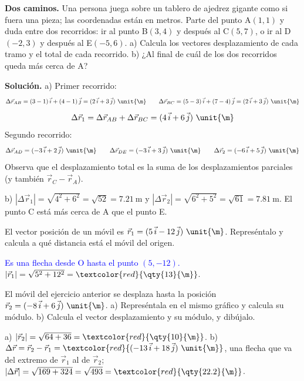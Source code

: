 \begin{example}
    \textbf{Dos caminos.} Una persona juega sobre un tablero de ajedrez gigante como si fuera una pieza; las coordenadas están en
    metros. Parte del punto A\((1, 1)\) y duda entre dos recorridos: ir al punto B\((3, 4)\) y después al C\((5, 7)\), o ir al
    D\((-2, 3)\) y después al E\((-5, 6)\). a) Calcula los vectores desplazamiento de cada tramo y el total de cada recorrido.
    b) ¿Al final de cuál de los dos recorridos queda más cerca de A?

    \textbf{Solución.} a) Primer recorrido:
    \[ \Delta\vec r_{AB} = (3 - 1)\,\ivec + (4 - 1)\,\jvec = (2\,\ivec + 3\,\jvec)~\unit{\m} \qquad
       \Delta\vec r_{BC} = (5 - 3)\,\ivec + (7 - 4)\,\jvec = (2\,\ivec + 3\,\jvec)~\unit{\m} \]
    \[ \Delta\vec r_1 = \Delta\vec r_{AB} + \Delta\vec r_{BC} = (4\,\ivec + 6\,\jvec)~\unit{\m} \]
    Segundo recorrido:
    \[ \Delta\vec r_{AD} = (-3\,\ivec + 2\,\jvec)~\unit{\m} \qquad \Delta\vec r_{DE} = (-3\,\ivec + 3\,\jvec)~\unit{\m} \qquad
       \Delta\vec r_2 = (-6\,\ivec + 5\,\jvec)~\unit{\m} \]
    Observa que el desplazamiento total es la suma de los desplazamientos parciales (y también \(\vec r_C - \vec r_A\)).

    b) \(|\Delta\vec r_1| = \sqrt{4^2 + 6^2} = \sqrt{52} = \qty{7.21}{\m}\) y \(|\Delta\vec r_2| = \sqrt{6^2 + 5^2} = \sqrt{61} =
    \qty{7.81}{\m}\). El punto C está más cerca de A que el punto E.
\end{example}

\begin{exercise}
    El vector posición de un móvil es \(\vec r_1 = (5\,\ivec - 12\,\jvec)~\unit{\m}\). Represéntalo y calcula a qué distancia
    está el móvil del origen.
    \begin{solu}
        \textcolor{blue}{Es una flecha desde O hasta el punto \((5, -12)\).} \(|\vec r_1| = \sqrt{5^2 + 12^2} = \textcolor{red}{\qty{13}{\m}}\).
    \end{solu}
\end{exercise}

\begin{exercise}
    El móvil del ejercicio anterior se desplaza hasta la posición \(\vec r_2 = (-8\,\ivec + 6\,\jvec)~\unit{\m}\). a) Represéntala
    en el mismo gráfico y calcula su módulo. b) Calcula el vector desplazamiento y su módulo, y dibújalo.
    \begin{solu}
        a) \(|\vec r_2| = \sqrt{64 + 36} = \textcolor{red}{\qty{10}{\m}}\). b) \(\Delta\vec r = \vec r_2 - \vec r_1 =
        \textcolor{red}{(-13\,\ivec + 18\,\jvec)~\unit{\m}}\), una flecha que va del extremo de \(\vec r_1\) al de \(\vec r_2\);
        \(|\Delta\vec r| = \sqrt{169 + 324} = \sqrt{493} = \textcolor{red}{\qty{22.2}{\m}}\).
    \end{solu}
\end{exercise}


